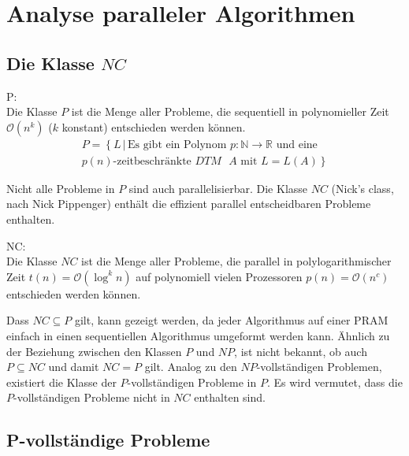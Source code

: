 \section{Analyse paralleler Algorithmen}

\subsection{Die Klasse $NC$}
\begin{define}
    P: \\
    Die Klasse $P$ ist die Menge aller Probleme, die sequentiell in 
    polynomieller Zeit $\mathcal{O}(n^k)$ ($k$ konstant) entschieden werden können.
    \begin{equation}
        \begin{split}
            P = \left\{ L \, | \, \text{Es gibt ein Polynom } p\colon \mathbb{N} \to \mathbb{R} \right.
            \text{ und eine} \\ \left. \text{$p(n)$-zeitbeschränkte $DTM$ $A$ mit } L = L(A) \right\}
        \end{split}
    \end{equation}\cite[S.205]{fgi1}\cite[S.44]{greenlaw}
\end{define}
Nicht alle Probleme in $P$ sind auch parallelisierbar.
Die Klasse $NC$ (Nick's class, nach Nick Pippenger) enthält die effizient parallel
entscheidbaren Probleme enthalten.
\begin{define}
    NC: \\
    Die Klasse $NC$ ist die Menge aller Probleme, die parallel in
    polylogarithmischer Zeit $t(n) = \mathcal{O}(\log^k n)$ auf polynomiell
    vielen Prozessoren $p(n) = \mathcal{O}(n^c)$ entschieden werden können.
    \cite[S.44]{greenlaw}
\end{define}
Dass $NC \subseteq P$ gilt, kann gezeigt werden, da jeder Algorithmus auf einer PRAM
einfach in einen sequentiellen Algorithmus umgeformt werden kann.
Ähnlich zu der Beziehung zwischen den Klassen $P$ und $NP$, ist nicht bekannt,
ob auch $P \subseteq NC$ und damit $NC = P$ gilt.
Analog zu den $NP$-vollständigen Problemen, existiert die Klasse der $P$-vollständigen Probleme in $P$.
Es wird vermutet, dass die $P$-vollständigen Probleme nicht in $NC$ enthalten sind.
\cite[S.535]{jaja}

\subsection{P-vollständige Probleme}
